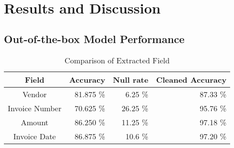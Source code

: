 \chapter{Results and Discussion}

\section{Out-of-the-box Model Performance}

\begin{table}[ht]   %
    \centering
    \footnotesize
    \begin{tabular}{c|rrr} %
        \toprule    %
        Field  & Accuracy  & Null rate & Cleaned Accuracy \\
        \midrule    %
        Vendor           & 81.875 \%   &  6.25 \%   & 87.33 \% \\
        Invoice Number   & 70.625 \%   & 26.25 \%  & 95.76 \%\\
        Amount           & 86.250 \%   & 11.25 \%  & 97.18 \% \\
        Invoice Date     & 86.875 \%   & 10.6  \%  & 97.20 \% \\
        \bottomrule %
    \end{tabular}
    \caption{Comparison of Extracted Field}
    \label{table:Field_Com}
\end{table}


